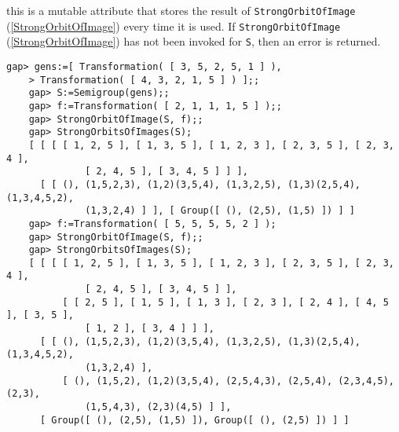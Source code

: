 \documentclass[a4paper,11pt]{report}
\begin{document}
{{{ this is a mutable attribute that stores the result of \texttt{StrongOrbitOfImage} (\ref{StrongOrbitOfImage}) every time it is used. If \texttt{StrongOrbitOfImage} (\ref{StrongOrbitOfImage}) has not been invoked for \texttt{S}, then an error is returned. 
\begin{Verbatim}[fontsize=\small,frame=single,label=Example]
    gap> gens:=[ Transformation( [ 3, 5, 2, 5, 1 ] ), 
    > Transformation( [ 4, 3, 2, 1, 5 ] ) ];;
    gap> S:=Semigroup(gens);;
    gap> f:=Transformation( [ 2, 1, 1, 1, 5 ] );;
    gap> StrongOrbitOfImage(S, f);;
    gap> StrongOrbitsOfImages(S);
    [ [ [ [ 1, 2, 5 ], [ 1, 3, 5 ], [ 1, 2, 3 ], [ 2, 3, 5 ], [ 2, 3, 4 ], 
              [ 2, 4, 5 ], [ 3, 4, 5 ] ] ], 
      [ [ (), (1,5,2,3), (1,2)(3,5,4), (1,3,2,5), (1,3)(2,5,4), (1,3,4,5,2), 
              (1,3,2,4) ] ], [ Group([ (), (2,5), (1,5) ]) ] ]
    gap> f:=Transformation( [ 5, 5, 5, 5, 2 ] );
    gap> StrongOrbitOfImage(S, f);;
    gap> StrongOrbitsOfImages(S); 
    [ [ [ [ 1, 2, 5 ], [ 1, 3, 5 ], [ 1, 2, 3 ], [ 2, 3, 5 ], [ 2, 3, 4 ], 
              [ 2, 4, 5 ], [ 3, 4, 5 ] ], 
          [ [ 2, 5 ], [ 1, 5 ], [ 1, 3 ], [ 2, 3 ], [ 2, 4 ], [ 4, 5 ], [ 3, 5 ], 
              [ 1, 2 ], [ 3, 4 ] ] ], 
      [ [ (), (1,5,2,3), (1,2)(3,5,4), (1,3,2,5), (1,3)(2,5,4), (1,3,4,5,2), 
              (1,3,2,4) ], 
          [ (), (1,5,2), (1,2)(3,5,4), (2,5,4,3), (2,5,4), (2,3,4,5), (2,3), 
              (1,5,4,3), (2,3)(4,5) ] ], 
      [ Group([ (), (2,5), (1,5) ]), Group([ (), (2,5) ]) ] ]
\end{Verbatim}
 }

 }

  }

  
\end{document}
